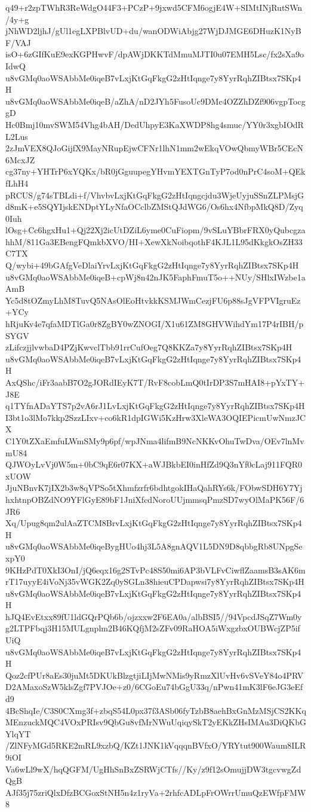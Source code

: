 q49+r2zpTWhR3ReWdgO44F3+PCzP+9jxwd5CFM6ogjE4W+SIMtINjRutSWn/4y+g
jNhWD2ljhJ/gUl1egLXPBlvUD+du/wanODWiAbjg27WjDJMGE6DHuzK1NyBF/VAJ
isO+6zGIfKuE9exKGPHwvF/dpAWjDKKTdMmuMJTI0u07EMH5Lsc/fx2sXa9oIdwQ
u8vGMq0aoWSAbbMe0iqeB7vLxjKtGqFkgG2zHtIqnge7y8YyrRqhZIBtsx7SKp4H
u8vGMq0aoWSAbbMe0iqeB/aZhA/nD2JYh5FusoUc9DMc4OZZhDZf906vgpTocggD
Hc0Bmj10mvSWM54Vhg4bAH/DedUhpyE3KaXWDP8hg4smuc/YY0r3xgbIOdRL2Lus
2zJmVEX8QJoGijfX9MayNRupEjwCFNr1lhN1mm2wEkqVOwQbmyWBr5CEcN6McxJZ
cg37ny+YHTrP6xYQKx/bR0jGguupegYHvmYEXTGnTyP7od0nPrC4soM+QEkfLhH4
pRCUS/g74sTBLdi+f/VhvbvLxjKtGqFkgG2zHtIqngcjdu3WjeUyjuSSnZLPMsjG
d8mK+e5SQYIjskENDptYLyNfaOCclbZMStQJdWG6/Os6hx4NfbpMkQ8D/Zyq0Iuh
lOsg+Cc6hgxHu1+Qj22Xj2icUtDZiL6yme0CuFiopm/9vSLuYBbrFRX0yQubcgza
hhM/811Ga3EBengFQmkbXVO/HI+XewXkNoibqothF4KJL1L95dKkgkOsZH33C7TX
Q/wybi+49bGAfgVeDlaiYrvLxjKtGqFkgG2zHtIqnge7y8YyrRqhZIBtsx7SKp4H
u8vGMq0aoWSAbbMe0iqeB+cpWj8n42nJK5FaphFmuT5o++NUy/SHlxIWzbe1aAmB
Yc5d8tOZmyLhM8TuvQ5NAsOlEoHtvkkKSMJWmCezjFU6p88sJgVFPVIgruEz+YCy
hRjuKv4e7qfaMDTlGa0r8ZgBY0wZNOGI/X1u61ZM8GHVWihdYm17P4rIBH/pSYGV
zLifczjjlvwbaD4PZjKwvclTbb91rrCufOeg7Q8KKZa7y8YyrRqhZIBtsx7SKp4H
u8vGMq0aoWSAbbMe0iqeB7vLxjKtGqFkgG2zHtIqnge7y8YyrRqhZIBtsx7SKp4H
AxQShc/iFr3aabB7O2gJORdIEyK7T/RvF8cobLmQ0tIrDP3S7mHAI8+pYxTY+J8E
q1TYfnADaYTS7p2vA6rJ1LvLxjKtGqFkgG2zHtIqnge7y8YyrRqhZIBtsx7SKp4H
I3bt1o3lMo7kkp2SzzLIxv+co6kR1dpIGWi5KzHrw3XleWA3OQIEPicmUwNmzJCX
C1Y0tZXaEmfuLWmSMy9p6pf/wpJNma4lifmB9NcNKKvOhuTwDva/OEv7lnMvmU84
QJWOyLvVj0W5m+0bC9qE6r07KX+aWJBkbEI0inHfZd9Q3nYf0cLaj911FQR0xUOW
JjuNBnvK7jIX2b3w8qVPSo5tXhmfzrfr6bdhtgokIHaQahRYs6k/FObwSDH6Y7Yj
hxhtnpOBZdNO9YFlGyE89bF1JniXfcdNoroUUjmmsqPmzSD7wyOlMaPK56F/6JR6
Xq/Upug8qm2ulAaZTCM8BrvLxjKtGqFkgG2zHtIqnge7y8YyrRqhZIBtsx7SKp4H
u8vGMq0aoWSAbbMe0iqeBygHUo4hj3L5A8gnAQV1L5DN9D8qbbgRb8UNpgSexpY0
9KHzPdT0XkI3OnI/jQ6eqx16g2STvPc48S50mi6AP3bVLFvCiwflZaamsB3sAK6m
rT17uyyE4iVoNj35vWGK2Zq0ySGLn38hieuCPDapwsi7y8YyrRqhZIBtsx7SKp4H
u8vGMq0aoWSAbbMe0iqeB7vLxjKtGqFkgG2zHtIqnge7y8YyrRqhZIBtsx7SKp4H
hJQ4EvEtxx89fU1ldGQrPQb6b/ojzxxw2F6EA0a/albBSI5//94VpcdJSqZ7Wm0y
g2LTPFbqj3H15MULgnplm2B46KQfjM2sZFv09RaHOA5iWxgzbxOUBWcjZP5ifUiQ
u8vGMq0aoWSAbbMe0iqeB7vLxjKtGqFkgG2zHtIqnge7y8YyrRqhZIBtsx7SKp4H
Qoz2cfPUr8aEs30juMt5DKUkBlzgtjiLIjMwNMis9yRmzXlUvHv6vSVeY84o4PRV
D2AMaxoSzW5klsZgf7PVJOe+z0/6CGoEu74bGgU33q/nPwn41mK3lF6eJG3eEfd9
4BcShqIe/C3S0CXmg3f+zbqS54L0px37f3ASb06fyTzbB8aehBxGnMzMSjCS2KKq
MEnzuckMQC4VOxPRIsv9QbGu8vfMrNWuUqiqySkT2yEKkZHsIMAu3DiQKbGYlqYT
/ZlNFyMGd5RKE2mRL9xzbQ/KZt1JNK1kVqqqnBVfxO/YRYtut900Waum8ILR9iOI
Va6wLl9wX/hqQGFM/UgHhSnBxZSRWjCTfs//Ky/z9f12sOmujjDW3tgcvwgZdQgB
AJf35j75zriQlxDfzBCGoxStNH5n4z1ryVa+2rhfcADLpFrOWrrUmuQzEWfpFMW8
